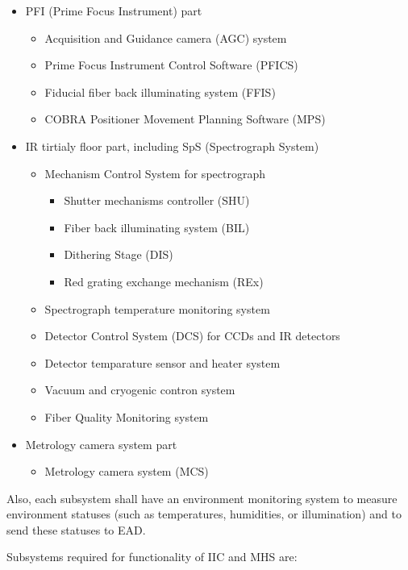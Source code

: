 \documentclass[a4paper,notitlepage]{article}
\begin{document}
\begin{itemize}
  \item PFI (Prime Focus Instrument) part
    \begin{itemize}
      \item Acquisition and Guidance camera (AGC) system
      \item Prime Focus Instrument Control Software (PFICS)
      \item Fiducial fiber back illuminating system (FFIS)
      \item COBRA Positioner Movement Planning Software (MPS)
    \end{itemize}
  \item IR tirtialy floor part, including SpS (Spectrograph System)
    \begin{itemize}
      \item Mechanism Control System for spectrograph
        \begin{itemize}
          \item Shutter mechanisms controller (SHU)
          \item Fiber back illuminating system (BIL)
          \item Dithering Stage (DIS)
          \item Red grating exchange mechanism (REx)
        \end{itemize}
      \item Spectrograph temperature monitoring system
      \item Detector Control System (DCS) for CCDs and IR detectors
      \item Detector temparature sensor and heater system
      \item Vacuum and cryogenic contron system
      \item Fiber Quality Monitoring system
    \end{itemize}
  \item Metrology camera system part
    \begin{itemize}
      \item Metrology camera system (MCS)
    \end{itemize}
\end{itemize}

Also, each subsystem shall have an environment monitoring system to 
measure environment statuses (such as temperatures, humidities, or 
illumination) and to send these statuses to EAD. 

Subsystems required for functionality of IIC and MHS are: 
\end{document}
